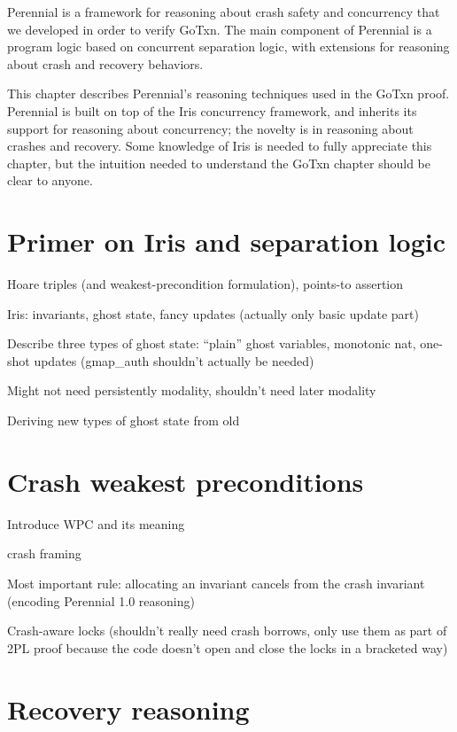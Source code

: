 Perennial is a framework for reasoning about crash safety and concurrency that
we developed in order to verify GoTxn. The main component of Perennial is a
program logic based on concurrent separation logic, with extensions for
reasoning about crash and recovery behaviors.

This chapter describes Perennial's reasoning techniques used in the GoTxn proof.
Perennial is built on top of the Iris concurrency framework, and inherits its
support for reasoning about concurrency; the novelty is in reasoning about
crashes and recovery. Some knowledge of Iris is needed to fully appreciate this
chapter, but the intuition needed to understand the GoTxn chapter should be
clear to anyone.

\section{Primer on Iris and separation logic}

Hoare triples (and weakest-precondition formulation), points-to assertion

Iris: invariants, ghost state, fancy updates (actually only basic update part)

Describe three types of ghost state: ``plain'' ghost variables, monotonic nat,
one-shot updates (gmap\_auth shouldn't actually be needed)

Might not need persistently modality, shouldn't need later modality

Deriving new types of ghost state from old


\section{Crash weakest preconditions}

Introduce WPC and its meaning

crash framing

Most important rule: allocating an invariant cancels from the crash invariant
(encoding Perennial 1.0 reasoning)

Crash-aware locks (shouldn't really need crash borrows, only use them as part of
2PL proof because the code doesn't open and close the locks in a bracketed way)

\section{Recovery reasoning}

